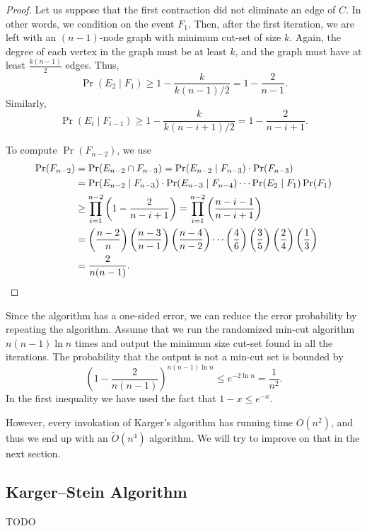 \begin{proof}
  Let us suppose that the first contraction did not eliminate an edge of $C$. 
  In other words, we condition on the event $F_1$. 
  Then, after the first iteration, we are left with an $(n - 1)$-node graph with
  minimum cut-set of size $k$. 
  Again, the degree of each vertex in the graph must be at least $k$, and the
  graph must have at least $\frac{k(n - 1)}{2}$ edges. 
  Thus,
  \[ \Pr(E_2 \mid F_1) \geq 1 - \frac{k}{k(n-1)/2} = 1 - \frac{2}{n-1}. \]
  Similarly,
  \[ \Pr(E_i \mid F_{i-1}) \geq 1 - \frac{k}{k(n-i+1)/2} = 1 - \frac{2}{n-i+1}. \]
  
  To compute $\Pr(F_{n-2})$, we use
  \begin{align*}
    \Pr(F_{n-2}) &= \Pr(E_{n-2} \cap F_{n-3}) = \Pr(E_{n-2} \mid F_{n-3}) \cdot \Pr(F_{n-3}) \\
                 &= \Pr(E_{n-2} \mid F_{n-3}) \cdot \Pr(E_{n-3} \mid F_{n-4}) \cdots \Pr(E_2 \mid F_1) \Pr(F_1) \\
                 &\geq \prod_{i=1}^{n-2} \left(1 - \frac{2}{n-i+1}\right) = \prod_{i=1}^{n-2} \left(\frac{n-i-1}{n-i+1}\right) \\
                 &= \left(\frac{n-2}{n}\right)\left(\frac{n-3}{n-1}\right)\left(\frac{n-4}{n-2}\right)
                   \cdots \left(\frac{4}{6}\right)\left(\frac{3}{5}\right)\left(\frac{2}{4}\right)\left(\frac{1}{3}\right) \\
                 &= \frac{2}{n(n-1)}.\qedhere
  \end{align*}
\end{proof}

Since the algorithm has a one-sided error, we can reduce the error probability
by repeating the algorithm. 
Assume that we run the randomized min-cut algorithm $n (n - 1) \ln n$ times and
output the minimum size cut-set found in all the iterations. 
The probability that the output is not a min-cut set is bounded by
\[ \left(1 - \frac{2}{n(n-1)}\right)^{n(n-1)\ln n} \leq e^{-2 \ln n} = \frac{1}{n^2}.\]
In the first inequality we have used the fact that $1-x \leq e^{-x}$.

However, every invokation of Karger's algorithm has running time $O(n^2)$, and
thus we end up with an $\widetilde{O}(n^4)$ algorithm. 
We will try to improve on that in the next section.

\subsection{Karger--Stein Algorithm}

TODO


